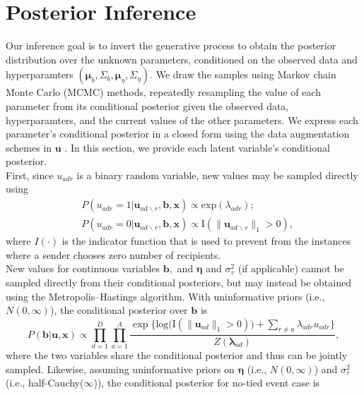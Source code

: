 \documentclass[12pt]{article}
\begin{document}
\section{Posterior Inference}\label{sec:inference}
Our inference goal is to invert the generative process to obtain the posterior distribution over the unknown parameters, conditioned on the observed data and hyperparamters $(\boldsymbol{\mu}_b, \Sigma_b, \boldsymbol{\mu}_\eta, \Sigma_\eta)$. We draw the samples using Markov chain Monte Carlo (MCMC) methods, repeatedly resampling the value of each parameter from its conditional posterior given the observed data, hyperparamters, and the current values of the other parameters. We express each parameter’s conditional posterior in a closed form using the data augmentation schemes in $\boldsymbol{u}$ \cite{tanner1987calculation}. In this section, we provide each latent variable's conditional posterior. \\ \newline
First, since $u_{adr}$ is a binary random variable, new values may be sampled directly using
\begin{equation}
\begin{aligned}
&P(u_{adr}=1| \boldsymbol{u}_{ad\backslash r}, \boldsymbol{b}, \boldsymbol{x})
\propto \mbox{exp}(\lambda_{adr});\\
&P(u_{adr}=0| \boldsymbol{u}_{ad\backslash r},\boldsymbol{b}, \boldsymbol{x})\propto \text{I}(\lVert\boldsymbol{u}_{ad\backslash r}\rVert_1 > 0 ),
\end{aligned}
\label{eqn:latentreceiver}
\end{equation}
where $I(\cdot)$ is the indicator function that is used to prevent from the instances where a sender chooses zero number of recipients.\\ \newline
New values for continuous variables $\boldsymbol{b},$ and $\boldsymbol{\eta}$ and $\sigma^2_\tau$ (if applicable) cannot be sampled directly from their conditional posteriors, but may instead be obtained using the Metropolis--Hastings algorithm. With uninformative priors (i.e., $N({0},\infty)$), the conditional posterior over $\boldsymbol{b}$ is
\begin{equation}
P(\boldsymbol{b}| \boldsymbol{u}, \boldsymbol{x})\propto \prod_{d=1}^D
\prod_{a=1}^A \frac{\exp\Big\{\mbox{log}\big(\text{I}( \lVert \boldsymbol{u}_{ad}\rVert_1 > 0)\big) + \sum\limits_{r \neq a} \lambda_{adr}u_{adr}\Big\}}{Z(\boldsymbol{\lambda}_{ad})},
\end{equation}
where the two variables share the conditional posterior and thus can be jointly sampled. Likewise, assuming uninformative priors on $\boldsymbol{\eta}$ (i.e., $N({0},\infty)$) and $\sigma_{\tau}^2$ (i.e., half-Cauchy($\infty$)), the conditional posterior for no-tied event case is
\end{document}
